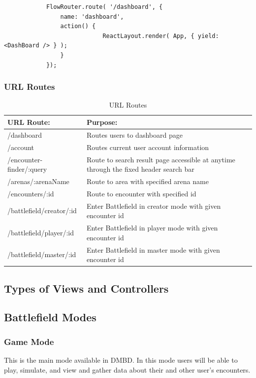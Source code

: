 \documentclass[12pt,a4paper]{report}
\begin{document}
		\begin{lstlisting}
			FlowRouter.route( '/dashboard', {
				name: 'dashboard',
				action() {
							ReactLayout.render( App, { yield: <DashBoard /> } );
				}
			});
		\end{lstlisting}
		
		\subsubsection { URL Routes}
		
			\begin{table}[H]
				\begin{center}
					\begin{tabular}{ |p{5cm}|p{7cm}|| } 
						\hline
						URL Route: & Purpose: \\
						\hline
						/dashboard & Routes users to dashboard page \\
						/account & Routes current user account information\\
						/encounter-finder/:query & Route to search result page accessible at anytime through the fixed header search bar  \\
						/arenas/:arenaName & Route to area with specified arena name  \\
						/encounters/:id & Route to encounter with specified id \\
						/battlefield/creator/:id & Enter Battlefield in creator mode with given encounter id \\
						/battlefield/player/:id & Enter Battlefield in player mode with given encounter id \\
						/battlefield/master/:id & Enter Battlefield in master mode with given encounter id \\	
						\hline
					\end{tabular}
				\end{center}
			\caption{URL Routes} \label{table: URL Routes}
		\end{table}
		
		
	\subsection{Types of Views and Controllers}
	\subsection{Battlefield Modes}
		\subsubsection{Game Mode}
			This is the main mode available in DMBD. In this mode users will be able to play, simulate, and view and gather data about their and other user's encounters.
\end{document}
